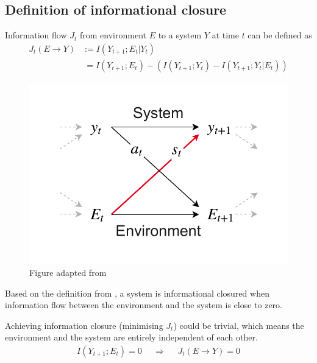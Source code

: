 \documentclass[utf8]{article}
\begin{document}
	
		\subsection{Definition of informational closure}
				
			\noindent Information flow $J_{t}$ from environment $E$ to a system $Y$ at time $t$ can be defined as			
				\begin{equation}\label{eq:InformationFlow}
				\left.\begin{array}
				{rl}{J_{t}(E \rightarrow Y )} & {:= I(Y_{t+1};E_{t}|Y_{t})} \\
				{ } & { \ = I(Y_{t+1};E_{t}) - (I(Y_{t+1};Y_{t})-I(Y_{t+1};Y_{t}|E_{t}))}
				\end{array}\right.
				\end{equation}
		
				\begin{figure}
					\includegraphics[width=\textwidth]{WritingMaterials/SystemAndEnv.pdf} 
					\caption{Figure adapted from \cite{BERTSCHINGER.2006}}
					\label{fig:SystemAndEnv}	
				\end{figure}
			
			
			\noindent
			Based on the definition from \cite{BERTSCHINGER.2006}, a system is informational closured when information flow between the environment and the system is close to zero.


			\noindent 
			Achieving information closure (minimising $J_t$) could be trivial, which means the environment and the system are entirely independent of each other.
				\begin{equation}
				\begin{aligned}
				{I(Y_{t+1};E_{t})=0}&&{\Rightarrow}&&{J_{t}(E \rightarrow Y )=0}
				\end{aligned}
				\end{equation}
\end{document}
